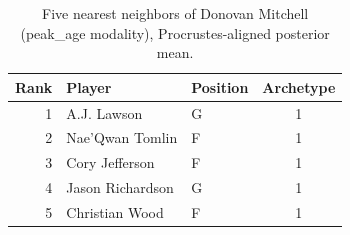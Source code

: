\begin{table}[htbp]
  \centering\small
  \begin{tabular}{rllc}
    \toprule
    Rank & Player & Position & Archetype \\
    \midrule
    1 & A.J. Lawson & G & 1 \\
    2 & Nae'Qwan Tomlin & F & 1 \\
    3 & Cory Jefferson & F & 1 \\
    4 & Jason Richardson & G & 1 \\
    5 & Christian Wood & F & 1 \\
    \bottomrule
  \end{tabular}
  \caption{Five nearest neighbors of Donovan Mitchell (peak_age modality), Procrustes-aligned posterior mean.}
  \label{tab:Donovan_Mitchell_neighbors_peak_age}
\end{table}

